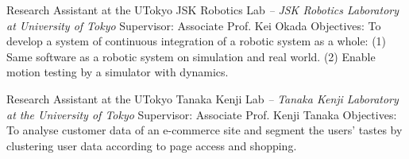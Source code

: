 \documentclass[letterpaper,MMMyyyy,nonstop]{simpleresumecv}
\begin{document}
\begin{body}
\BigGapNoBreak

Research Assistant at the UTokyo JSK Robotics Lab
\hfill
\textit{ -- }
\newline
\textit{JSK Robotics Laboratory at University of Tokyo}
\newline
Supervisor: Associate Prof. Kei Okada
\newline
Objectives: To develop a system of continuous integration of a robotic system as a whole:
(1) Same software as a robotic system on simulation and real world.
(2) Enable motion testing by a simulator with dynamics.

\BigGapNoBreak

Research Assistant at the UTokyo Tanaka Kenji Lab
\hfill
\textit{ -- }
\newline
\textit{Tanaka Kenji Laboratory at the University of Tokyo}
\newline
Supervisor: Associate Prof. Kenji Tanaka
\newline
Objectives: To analyse customer data of an e-commerce site and segment the users' tastes by clustering
user data according to page access and shopping.


\end{body}
\end{document}
